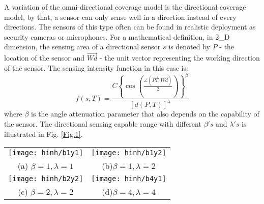\documentclass[final]{elsarticle}
\begin{document}
A variation of the omni-directional coverage model is the directional coverage model, by that, a sensor can only sense well in a direction instead of every directions. The sensors of this type often can be found in realistic deployment as security cameras or microphones. For a mathematical definition, in 2\_D dimension, the sensing area of a directional sensor $ s $ is denoted by $ P $ - the location of the sensor and $ \overrightarrow{Wd}$ - the unit vector representing the working direction of the sensor. The sensing intensity function in this case is:
\begin{equation}
\label{eq2}
f({s},T) = \frac{{C{{\left\{ {\cos \left( {\frac{{\angle (\overrightarrow {PT} ,\overrightarrow {Wd}) }}{2}} \right)} \right\}}^\beta }}}{{{{\left[ {d(P,T)} \right]}^\lambda }}}
\end{equation}
where $\beta$ is the angle attenuation parameter that also depends on the capability of the sensor. The directional sensing capable range with different $ \beta's $ and $ \lambda's $ is illustrated in Fig. \ref{Fig.1}. \\
\begin{figure*}[h]
	\begin{tabular}{cc}
		\texttt{[image: hinh/b1y1]}&\texttt{[image: hinh/b1y2]}\\
		(a) $\beta =1, \lambda=1 $ &(b)$ \beta=1, \lambda=2 $\\
		\texttt{[image: hinh/b2y2]}&\texttt{[image: hinh/b4y1]}\\
		(c) $ \beta=2, \lambda=2 $& (d)$ \beta=4, \lambda=4 $\\
	\end{tabular}
	\centering
	\caption{Illustration attenuated directional sensing model with different $ \beta's $ and $ \lambda's $
	}
	\label{Fig.1}       %
\end{figure*}
\end{document}
